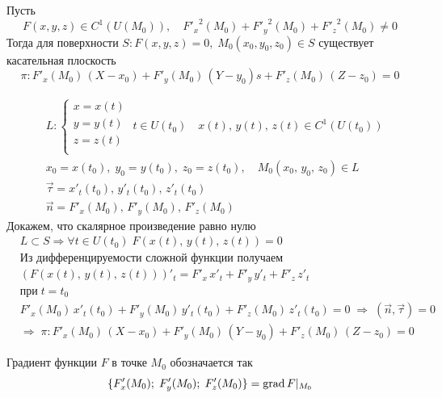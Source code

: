 		\begin{Th} Пусть
            \[
                F(x, y, z) \in C^1(U(M_0)), \quad {F'_x}^2(M_0) + {F'_y}^2(M_0) + {F'_z}^2(M_0) \neq 0
            \]
			Тогда для поверхности $S : F(x, y, z) = 0, \; M_0(x_0, y_0, z_0) \in S$ существует касательная плоскость 
            \[
                \pi : F'_x(M_0)\,(X-x_0) + F'_y(M_0)\,(Y-y_0) s+ F'_z(M_0)\,(Z-z_0) = 0
            \]
		\end{Th}
		\begin{Proof}
			\begin{align*}
			&L:\begin{cases}
					x = x(t)\\
					y = y(t)\\
					z = z(t)\\	
			   \end{cases} \; t \in U(t_0) \quad x(t),\, y(t),\, z(t) \in C^1(U(t_0))\\
			&x_0 = x(t_0), \; y_0 = y(t_0), \; z_0 = z(t_0), \quad M_0(x_0,\, y_0,\, z_0) \in L\\
			&\vec{\tau} = {x'_t(t_0),\, y'_t(t_0),\, z'_t(t_0)}\\
			&\vec{n} = {F'_x(M_0),\, F'_y(M_0),\, F'_z(M_0)}
			\end{align*}
            Докажем, что скалярное произведение равно нулю
            \begin{align*}
			&L \subset S \Rightarrow \forall t \in U(t_0) \; F(x(t),\, y(t),\, z(t)) = 0\\
			&\text{Из дифференцируемости сложной функции получаем}\\
			&(F(x(t),\, y(t),\, z(t)))'_t = F'_x\, x'_t + F'_y\, y'_t + F'_z\, z'_t\\ &\text{при} \; t = t_0\\
			&F'_x(M_0)\,x'_t(t_0) + F'_y(M_0)\,y'_t(t_0) + F'_z(M_0)\,z'_t(t_0) = 0 \; \Rightarrow \; (\vec{n}, \vec{\tau}) = 0\\
			&\Rightarrow \; \pi : F'_x(M_0)\,(X-x_0) + F'_y(M_0)\,(Y-y_0) + F'_z(M_0)\,(Z-z_0) = 0
			\end{align*}
		\end{Proof}
		
		\begin{Def}[Градиент] Градиент функции $F$ в точке $M_0$ обозначается так
        \[ 
            \{F'_x(M_0);\; F'_y(M_0);\; F'_z(M_0)\} = \mathop{\mathrm{grad}} F |_{M_0}
        \]  
		\end{Def}
	
